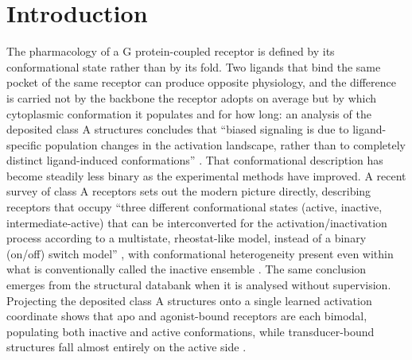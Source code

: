 
\section{Introduction}



The pharmacology of a G protein-coupled receptor is defined by its conformational state rather
than by its fold. Two ligands that bind the same pocket of the same receptor can produce opposite
physiology, and the difference is carried not by the backbone the receptor adopts on average but
by which cytoplasmic conformation it populates and for how long: an analysis of the deposited class
A structures concludes that ``biased signaling is due to ligand-specific population changes in the
activation landscape, rather than to completely distinct ligand-induced conformations''
\citep[p.~8]{paajanen2026activation}. That conformational description
has become steadily less binary as the experimental methods have improved. A recent survey of
class A receptors sets out the modern picture directly, describing receptors that occupy ``three
different conformational states (active, inactive, intermediate-active) that can be interconverted
for the activation/inactivation process according to a multistate, rheostat-like model, instead of
a binary (on/off) switch model'' \citep[p.~3696]{georgiou2025heterogeneity}, with conformational heterogeneity
present even within what is conventionally called the inactive ensemble
\citep[p.~3699]{georgiou2025heterogeneity}. The same conclusion emerges from the structural databank when it
is analysed without supervision. Projecting the deposited class A structures onto a single learned
activation coordinate shows that apo and agonist-bound receptors are each bimodal, populating both
inactive and active conformations, while transducer-bound structures fall almost entirely on the
active side \citep{paajanen2026activation}.

